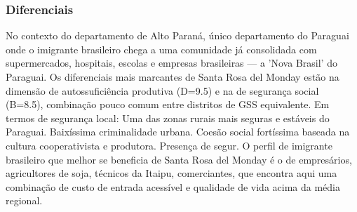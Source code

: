 \subsubsection*{Diferenciais}\label{dif-santa-rosa-del-monday-1015}
No contexto do departamento de Alto Paraná, único departamento do Paraguai onde o imigrante brasileiro chega a uma comunidade já consolidada com supermercados, hospitais, escolas e empresas brasileiras — a 'Nova Brasil' do Paraguai. Os diferenciais mais marcantes de Santa Rosa del Monday estão na dimensão de autossuficiência produtiva (D=9.5) e na de segurança social (B=8.5), combinação pouco comum entre distritos de GSS equivalente. Em termos de segurança local: Uma das zonas rurais mais seguras e estáveis do Paraguai. Baixíssima criminalidade urbana. Coesão social fortíssima baseada na cultura cooperativista e produtora. Presença de segur. O perfil de imigrante brasileiro que melhor se beneficia de Santa Rosa del Monday é o de empresários, agricultores de soja, técnicos da Itaipu, comerciantes, que encontra aqui uma combinação de custo de entrada acessível e qualidade de vida acima da média regional.
